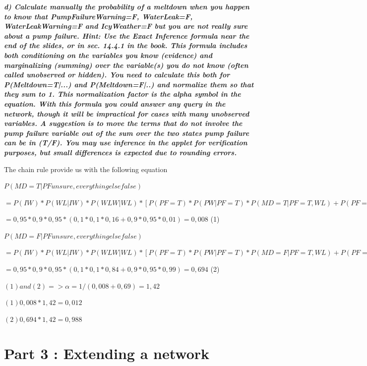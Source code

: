 \textit{\textbf{d) Calculate manually the probability of a meltdown when you
happen to know that PumpFailureWarning=F, WaterLeak=F, WaterLeakWarning=F and
 IcyWeather=F but you are not really sure about a pump failure.
    Hint: Use the Exact Inference formula near the end of the slides,
or in sec. 14.4.1 in the book. This formula includes both conditioning
on the variables you know (evidence) and marginalizing (summing) over the
variable(s) you do not know (often called unobserved or hidden). You need
to calculate this both for P(Meltdown=T|...) and P(Meltdown=F|..) and normalize
them so that they sum to 1. This normalization factor is the alpha symbol in
the equation. With this formula you could answer any query in the network,
though it will be impractical for cases with many unobserved variables. A
suggestion is to move the terms that do not involve the pump failure variable
out of the sum over the two states pump failure can be in (T/F). You may use
inference in the applet for verification purposes, but small differences
is expected due to rounding errors.}}


The chain rule provide us with the following equation

$P(MD = T | PF unsure,  everything else false)$

$= P(IW) * P(WL | IW) * P(WLW | WL)* [P(PF=T) * P(PW | PF=T) * P(MD=T | PF=T,WL) + P(PF=F) * P(PW | PF=F) * P(MD=T | PF=F,WL)]$

$= 0,95 * 0,9 * 0,95 * (0,1 * 0,1 * 0,16 + 0,9 * 0,95 * 0,01) = 0,008$ (1)

$P(MD=F | PF unsure,  everything else false)$

$=P(IW) * P(WL | IW) * P(WLW | WL)* [P(PF=T) * P(PW | PF=T) * P(MD=F | PF=T,WL) + P(PF=F) * P(PW | PF=F) * P(MD=F | PF=F,WL)]$

$= 0,95 * 0,9 * 0,95 * (0,1 * 0,1 * 0,84 + 0,9 * 0,95 * 0,99) =0,694$ (2)

$(1) and (2) => \alpha = 1 / (0,008 + 0,69) = 1,42 $

$(1) 0,008 * 1,42 = 0,012 $

$(2) 0,694 * 1,42 = 0,988 $




\newpage
\thispagestyle{empty}
\section*{Part 3 : Extending a network}

